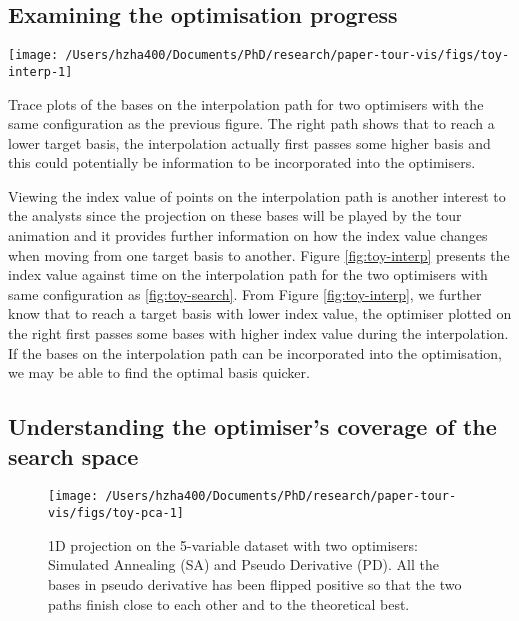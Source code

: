 \hypertarget{toy-interp}{%
\subsection{Examining the optimisation progress}\label{toy-interp}}

\begin{Schunk}
\begin{widefigure}

{\centering \texttt{[image: /Users/hzha400/Documents/PhD/research/paper-tour-vis/figs/toy-interp-1]} 

}

\caption[Trace plots of the bases on the interpolation path for two optimisers with the same configuration as the previous figure]{Trace plots of the bases on the interpolation path for two optimisers with the same configuration as the previous figure. The right path shows that to reach a lower target basis, the interpolation actually first passes some higher basis and this could potentially be information to be incorporated into the optimisers.}\label{fig:toy-interp}
\end{widefigure}
\end{Schunk}

Viewing the index value of points on the interpolation path is another
interest to the analysts since the projection on these bases will be
played by the tour animation and it provides further information on how
the index value changes when moving from one target basis to another.
Figure \ref{fig:toy-interp} presents the index value against time on the
interpolation path for the two optimisers with same configuration as
\ref{fig:toy-search}. From Figure \ref{fig:toy-interp}, we further know
that to reach a target basis with lower index value, the optimiser
plotted on the right first passes some bases with higher index value
during the interpolation. If the bases on the interpolation path can be
incorporated into the optimisation, we may be able to find the optimal
basis quicker.

\hypertarget{understanding-the-optimisers-coverage-of-the-search-space}{%
\subsection{Understanding the optimiser's coverage of the search
space}\label{understanding-the-optimisers-coverage-of-the-search-space}}

\begin{Schunk}
\begin{figure}

{\centering \texttt{[image: /Users/hzha400/Documents/PhD/research/paper-tour-vis/figs/toy-pca-1]} 

}

\caption[1D projection on the 5-variable dataset  with two optimisers]{1D projection on the 5-variable dataset  with two optimisers: Simulated Annealing (SA) and Pseudo Derivative (PD). All the bases in pseudo derivative has been flipped positive so that the two paths finish close to each other and to the theoretical best.}\label{fig:toy-pca}
\end{figure}
\end{Schunk}

